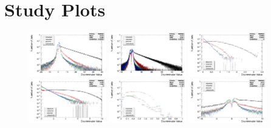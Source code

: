 \chapter{\btagging Study Plots}
\label{ac:b_tagging_plots}

\begin{figure}[hbtp]
   \centering
     \includegraphics[width=0.3\textwidth]{Chapters/06_BTag_Study/Images/TrackCountingHighEfficiency_norm_discriminator_combined}\hfill
     \includegraphics[width=0.3\textwidth]{Chapters/06_BTag_Study/Images/TrackCountingHighPurity_norm_discriminator_combined}\hfill
     \includegraphics[width=0.3\textwidth]{Chapters/06_BTag_Study/Images/JetProbability_norm_discriminator_combined}\\
     \includegraphics[width=0.3\textwidth]{Chapters/06_BTag_Study/Images/JetBProbability_norm_discriminator_combined}\hfill
     \includegraphics[width=0.3\textwidth]{Chapters/06_BTag_Study/Images/SoftMuon_norm_discriminator_combined}\hfill
     \includegraphics[width=0.3\textwidth]{Chapters/06_BTag_Study/Images/SoftMuonByIP3D_norm_discriminator_combined}\\

\end{figure}
